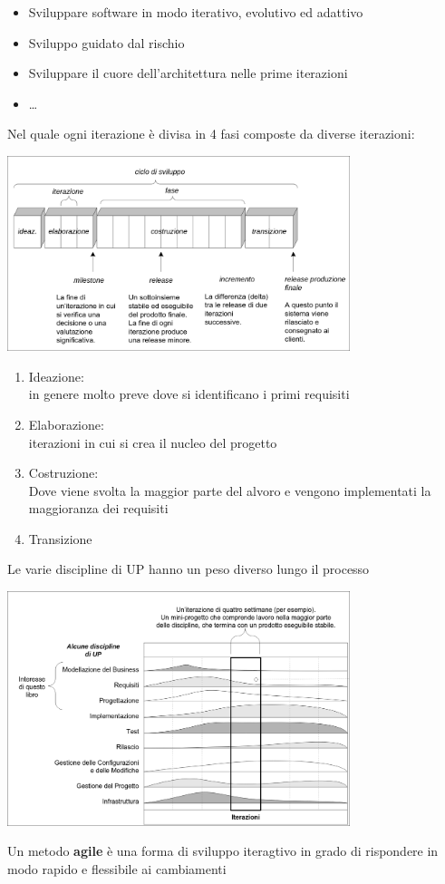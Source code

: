 \documentclass{article}
\begin{document}
\begin{itemize}
  \item Sviluppare software in modo iterativo, evolutivo ed adattivo
  \item Sviluppo guidato dal rischio
  \item Sviluppare il cuore dell'architettura nelle prime iterazioni
  \item \dots
\end{itemize}
Nel quale ogni iterazione è divisa in 4 fasi composte da diverse iterazioni:
\begin{center}
  \includegraphics[width=10cm]{images/fasi up.png}
\end{center}
\begin{enumerate}
  \item Ideazione:\\
        in genere molto preve dove si identificano i primi requisiti
  \item Elaborazione:\\
        iterazioni in cui si crea il nucleo del progetto
  \item Costruzione:\\
        Dove viene svolta la maggior parte del alvoro e vengono implementati la maggioranza dei requisiti
  \item Transizione
\end{enumerate}
Le varie discipline di UP hanno un peso diverso lungo il processo
\begin{center}
  \includegraphics[width=10cm]{images/discipline up nello sviluppo.png}
\end{center}
\newpage
Un metodo \textbf{agile} è una forma di sviluppo iteragtivo in grado di rispondere in modo rapido e flessibile ai cambiamenti
\end{document}

